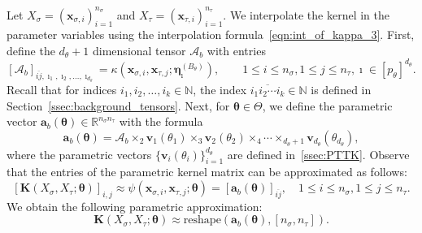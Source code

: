 \documentclass[final,3p,times]{elsarticle}
\renewcommand{\vec}[1]{\boldsymbol{#1}}
\newcommand{\mat}[1]{\boldsymbol{#1}}
\newcommand{\R}{\mathbb{R}}
\newcommand{\ten}[1]{\boldsymbol{\mathcal{#1}}}
\begin{document}
Let ${X}_{\sigma} = (\vec{x}_{\sigma, i} )_{i=1}^{n_{\sigma}}$ and ${X}_{\tau} = ( \vec{x}_{\tau, i})_{i=1}^{n_{\tau}}$. We interpolate the kernel in the parameter variables using the interpolation formula~\eqref{eqn:int_of_kappa_3}. First, define the $d_{\theta} + 1$ dimensional tensor $\ten{A}_{b}$ with entries
$$[\ten{A}_{b}]_{\overline{i j}, \imath_1, \imath_2, \dots, \imath_{d_\theta}} = \kappa(\vec{x}_{\sigma, i}, \vec{x}_{\tau, j}; \vec{\eta}^{(B_{\theta})}_{\vec{\imath}}), \qquad 1 \le i \le n_{\sigma}, 1 \le j \le n_{\tau}, \vec{\imath} \in [p_{\theta}]^{d_\theta}.$$
Recall that for indices $i_1, i_2, \dots, i_k \in \mathbb{N}$, the index $\overline{i_1i_2\cdots i_k} \in \mathbb{N}$ is defined in Section~\ref{ssec:background_tensors}.
Next, for $\vec{\theta} \in \Theta$, we define the parametric vector $\vec{a}_{b}(\vec{\theta}) \in \R^{n_{\sigma}n_{\tau}}$ with the formula
$$\vec{a}_b(\vec{\theta}) = \ten{A}_{b}  \times_{2} \vec{v}_{1}(\theta_1) \times_{3} \vec{v}_{2}(\theta_{2}) \times_{4} \cdots \times_{d_\theta + 1} \vec{v}_{d_\theta}(\theta_{d_\theta}),$$
where the parametric vectors $\{\vec{v}_{i}(\theta_i)\}_{i=1}^{d_{\theta}}$ are defined in~\ref{ssec:PTTK}.
Observe that the entries of the parametric kernel matrix can be approximated as follows:
$$[\mat{K}({X}_{\sigma}, {X}_{\tau};\vec{\theta})]_{i, j} \approx \psi(\vec{x}_{\sigma, i}, \vec{x}_{\tau, j}; \vec{\theta}) = [\vec{a}_{b}(\vec{\theta})]_{\overline{ij}}, \quad 1 \le i \le n_{\sigma}, 1 \le j \le n_{\tau}.$$
We obtain the following parametric approximation:
\begin{equation}\label{eqn:fin_nf_approx_1}
    \mat{K}({X}_{\sigma}, {X}_{\tau};\vec{\theta}) \approx \text{reshape}(\vec{a}_b(\vec{\theta}), [n_{\sigma}, n_{\tau}]).
\end{equation}
\end{document}
